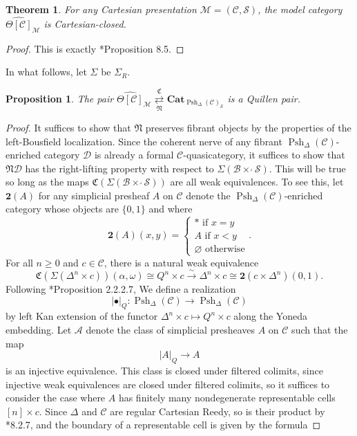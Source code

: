 \documentclass[leqno]{article}
\numberwithin{equation}{subsection}
\theoremstyle{plain}   %
\newtheorem{thm}[equation]{Theorem}
\newtheorem{prop}[equation]{Proposition}
\theoremstyle{remark}
\theoremstyle{plain}
\newcommand{\Cat}{\ensuremath{\mathbf{Cat}}}
\newcommand{\realiz}[1]{\ensuremath{\left\lvert#1\right\rvert}}
\providecommand{\C}{}
\renewcommand{\C}{\ensuremath{\mathcal{C}}}
\newcommand{\M}{\ensuremath{\mathcal{M}}}
\newcommand{\setS}{\ensuremath{\mathscr{S}}}
\newcommand{\cellset}{\ensuremath{\widehat{\Theta[\mathcal{C}]}}}
\newcommand{\spsh}{\ensuremath{\operatorname{Psh}_\Delta(\mathcal{C})}}
\begin{document}
\begin{thm} For any Cartesian presentation \(\M=(\C,\setS)\), the model category \(\cellset_{\M}\) is Cartesian-closed.  
\end{thm}
\begin{proof}
  This is exactly \cite{rezk-theta-n-spaces}*{Proposition 8.5}.
\end{proof}

In what follows, let \(\Sigma\) be \(\Sigma_R\).  

\begin{prop} The pair \(\cellset_\M \underset{\mathfrak{N}}{\overset{\mathfrak{C}}{\rightleftarrows}} \Cat_{\spsh_{\setS}}\) is a Quillen pair.
\end{prop}
\begin{proof}
  It suffices to show that \(\mathfrak{N}\) preserves fibrant objects by the properties of the left-Bousfield localization.  Since the coherent nerve of any fibrant \(\spsh\)-enriched category \(\mathcal{D}\) is already a formal \(\C\)-quasicategory, it suffices to show that \(\mathfrak{N}\mathcal{D}\) has the right-lifting property with respect to \(\Sigma(\mathscr{B}\times^\lrcorner \setS)\).  This will be true so long as the maps \(\mathfrak{C}(\Sigma(\mathscr{B}\times^\lrcorner \setS))\) are all weak equivalences.  To see this, let \(\mathbf{2}(A)\) for any simplicial presheaf \(A\) on \(\C\) denote the \(\spsh\)-enriched category whose objects are \(\{0,1\}\) and where 
  \[
    \mathbf{2}(A)(x,y)=
    \begin{cases}
      \ast \text{ if } x=y\\
      A \text{ if } x<y\\
      \varnothing \text{ otherwise}
    \end{cases}. 
  \]
  For all \(n \geq 0\) and \(c \in \C\), there is a natural weak equivalence 
  \[\mathfrak{C}(\Sigma(\Delta^n \times c))(\alpha,\omega) \cong Q^n \times c \xrightarrow{\sim} \Delta^n \times c \cong \mathbf{2}(c\times \Delta^n)(0,1).\] 
  Following \cite{htt}*{Proposition 2.2.2.7}, We define a realization 
  \[\realiz{\bullet}_{Q}:\spsh\to \spsh\] 
  by left Kan extension of the functor \(\Delta^n\times c \mapsto Q^n \times c\) along the Yoneda embedding. Let \(\mathcal{A}\) denote the class of simplicial presheaves \(A\) on \(\C\) such that the map
  \[\realiz{A}_Q \to A\]
  is an injective equivalence.  This class is closed under filtered colimits, since injective weak equivalences are closed under filtered colimits, so it suffices to consider the case where \(A\) has finitely many nondegenerate representable cells \([n] \times c\).  Since \(\Delta\) and \(\C\) are regular Cartesian Reedy, so is their product by \cite{cisinski-book}*{8.2.7}, and the boundary of a representable cell is given by the formula 

\end{proof}
\end{document}
